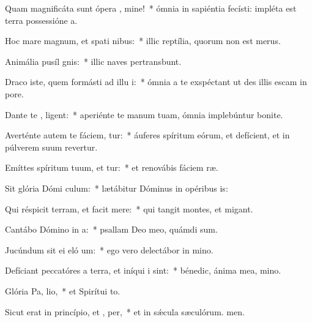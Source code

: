 \item Quam magnificáta sunt ópera , mine!~* ómnia in sapiéntia fecísti: impléta est terra possessióne a.
\item Hoc mare magnum, et spati nibus:~* illic reptília, quorum non est merus.
\item Animália pusíl  gnis:~* illic naves pertransbunt.
\item Draco iste, quem formásti ad illu i:~* ómnia a te exspéctant ut des illis escam in pore.
\item Dante te , ligent:~* aperiénte te manum tuam, ómnia implebúntur bonite.
\item Averténte autem te fáciem, tur:~* áuferes spíritum eórum, et defícient, et in púlverem suum revertur.
\item Emíttes spíritum tuum, et tur:~* et renovábis fáciem ræ.
\item Sit glória Dómi  culum:~* lætábitur Dóminus in opéribus is:
\item Qui réspicit terram, et facit  mere:~* qui tangit montes, et migant.
\item Cantábo Dómino in  a:~* psallam Deo meo, quámdi sum.
\item Jucúndum sit ei eló um:~* ego vero delectábor in mino.
\item Defíciant peccatóres a terra, et iníqui i   sint:~* bénedic, ánima mea, mino.
\item Glória Pa,  lio,~* et Spirítui to.
\item Sicut erat in princípio, et ,  per,~* et in sǽcula sæculórum. men.
